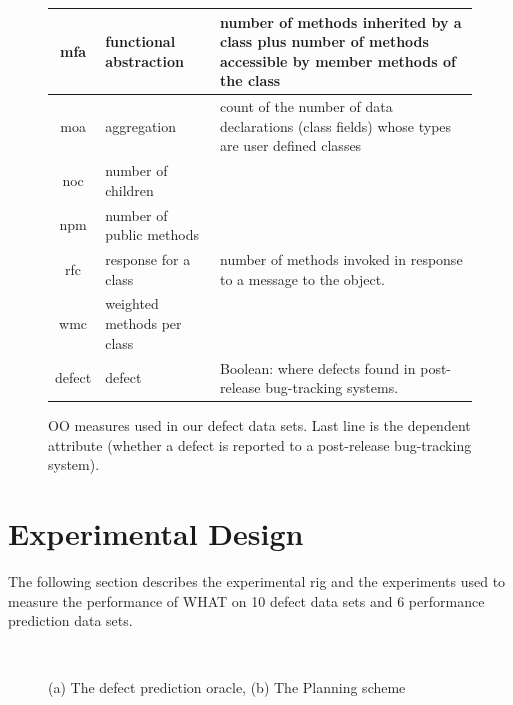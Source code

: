 \documentclass[conference]{IEEEtran}
\begin{document}
\begin{figure}[htbp!]
\begin{center}
{\begin{tabular}{c|l|p{4.7in}}
        mfa & functional abstraction & number of methods inherited by a class
        plus number of methods accessible by member methods of the
        class\\\hline
        moa &  aggregation &  count of the number of data declarations (class
        fields) whose types are user defined classes\\\hline
        noc &  number of children &\\\hline
        npm & number of public methods & \\\hline
        rfc & response for a class &number of  methods invoked in response to
        a message to the object.\\\hline
        wmc & weighted methods per class &\\\hline
        \rowcolor{lightgray}
        defect & defect & Boolean: where defects found in post-release bug-tracking systems.
      \end{tabular}
    }
  \end{center}
  \caption{OO measures used in our defect data sets.  Last line is
    the dependent attribute (whether a defect is reported to  a
    post-release bug-tracking system).}\label{fig:ck}
\end{figure}

\section{Experimental Design}
The following section describes the experimental rig and the experiments used to measure the performance of WHAT on 10 defect data sets and 6 performance prediction data sets.

\begin{figure}[tbp!]
  \\
  \caption{(a) The defect prediction oracle, (b) The Planning scheme}
  \label{fig:rig}
\end{figure}
\end{document}
